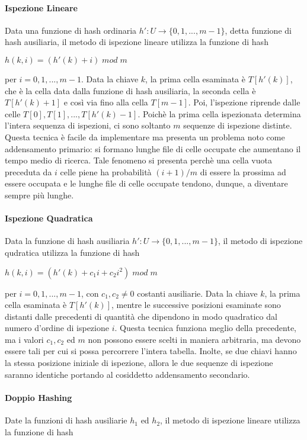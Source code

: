 \paragraph{Ispezione Lineare}
 Data una funzione di hash ordinaria \(h':U\to \{0,1,...,m-1\}\), detta funzione di hash ausiliaria, il metodo di ispezione lineare utilizza la funzione di hash

\(h(k,i)=(h'(k)+i)\;mod\;m\)

\noindent per \(i=0,1,...,m-1\). Data la chiave \(k\), la prima cella esaminata è \(T[h'(k)]\), che è la cella data dalla funzione di hash ausiliaria, la seconda cella è \(T[h'(k)+1]\) e così via fino alla cella \(T[m-1]\). Poi, l'ispezione riprende dalle celle \(T[0], T[1],...,T[h'(k)-1]\). Poichè la prima cella ispezionata determina l'intera sequenza di ispezioni, ci sono soltanto \(m\) sequenze di ispezione distinte. Questa tecnica è facile da implementare ma presenta un problema noto come addensamento primario: si formano lunghe file di celle occupate che aumentano il tempo medio di ricerca. Tale fenomeno si presenta perchè una cella vuota preceduta da \(i\) celle piene ha probabilità \((i+1)/m\) di essere la prossima ad essere occupata e le lunghe file di celle occupate tendono, dunque, a diventare sempre più lunghe.

\paragraph{Ispezione Quadratica} Data la funzione di hash ausiliaria \(h':U\to \{0,1,...,m-1\}\), il metodo di ispezione qudratica utilizza la funzione di hash

\(h(k,i)=(h'(k)+c_1i+c_2i^2)\;mod\;m\)

\noindent per \(i=0,1,...,m-1\), con \(c_1, c_2 \neq 0 \) costanti ausiliarie. Data la chiave \(k\), la prima cella esaminata è \(T[h'(k)]\), mentre le successive posizioni esaminate sono distanti dalle precedenti di quantità che dipendono in modo quadratico dal numero d'ordine di ispezione \(i\). Questa tecnica funziona meglio della precedente, ma i valori \(c_1, c_2\) ed \(m\) non possono essere scelti in maniera arbitraria, ma devono essere tali per cui si possa percorrere l'intera tabella. Inolte, se due chiavi hanno la stessa posizione iniziale di ispezione, allora le due sequenze di ispezione saranno identiche portando al cosiddetto addensamento secondario.

\paragraph{Doppio Hashing} Date la funzioni di hash ausiliarie \(h_1\) ed \(h_2\), il metodo di ispezione lineare utilizza la funzione di hash

